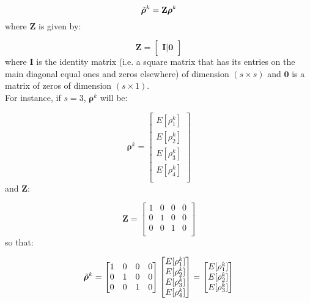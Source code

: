 \documentclass[\main/main.tex]{subfiles}
\begin{document}
\begin{equation}
    \Tilde{\bm{\rho}}^k = \mathbf{Z}\bm{\rho}^k
\end{equation}
where $\mathbf{Z}$ is given by:

\begin{equation}
\mathbf{Z}=
    \begin{bmatrix}
    \mathbf{I} | \mathbf{0}
    \end{bmatrix}
\end{equation}
where $\mathbf{I}$ is the identity matrix (i.e. a square matrix that has its entries on the main diagonal equal ones  and zeros elsewhere)  of dimension $(s \times s) $ and $\mathbf{0}$ is a matrix of zeros of dimension $(s \times 1) $. \\ 

\noindent For instance, if $s = 3$,  $\bm{\rho}^k$ will be:

\begin{equation}
\bm{\rho}^k =
\begin{bmatrix}
E[\rho^k_1]\\
E[\rho^k_2]\\
E[\rho^k_{3}]\\
E[\rho^k_{4}]\\
\end{bmatrix}
\end{equation}
and $\mathbf{Z}$:

\begin{equation}
\mathbf{Z}=
    \begin{bmatrix}
   1 & 0 & 0 & 0\\
    0 & 1 & 0 & 0\\
     0 & 0 & 1 & 0\\
    \end{bmatrix}
\end{equation}
so that:

\begin{equation}
\Tilde{\bm{\rho}}^k =
    \begin{bmatrix}
   1 & 0 & 0 & 0\\
    0 & 1 & 0 & 0\\
     0 & 0 & 1 & 0\\
    \end{bmatrix}
    \begin{bmatrix}
E[\rho^k_1]\\
E[\rho^k_2]\\
E[\rho^k_{3}]\\
E[\rho^k_{4}]\\
\end{bmatrix} = 
\begin{bmatrix}
E[\rho^k_1]\\
E[\rho^k_2]\\
E[\rho^k_{3}]\\
\end{bmatrix}
\end{equation}
\end{document}

